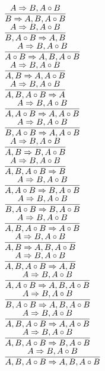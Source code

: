 \documentclass[11pt]{article}
\begin{document}
\begin{center}
\bigskip
\\$\infer{B\Rightarrow A, B, A\circ B}{A\Rightarrow B, A\circ B}$
\bigskip
\\$\infer{B, A\circ B\Rightarrow A, B}{A\Rightarrow B, A\circ B}$
\bigskip
\\$\infer{A\circ B\Rightarrow A, B, A\circ B}{A\Rightarrow B, A\circ B}$
\bigskip
\\$\infer{A, B\Rightarrow A, A\circ B}{A\Rightarrow B, A\circ B}$
\bigskip
\\$\infer{A, B, A\circ B\Rightarrow A}{A\Rightarrow B, A\circ B}$
\bigskip
\\$\infer{A, A\circ B\Rightarrow A, A\circ B}{A\Rightarrow B, A\circ B}$
\bigskip
\\$\infer{B, A\circ B\Rightarrow A, A\circ B}{A\Rightarrow B, A\circ B}$
\bigskip
\\$\infer{A, B\Rightarrow B, A\circ B}{A\Rightarrow B, A\circ B}$
\bigskip
\\$\infer{A, B, A\circ B\Rightarrow B}{A\Rightarrow B, A\circ B}$
\bigskip
\\$\infer{A, A\circ B\Rightarrow B, A\circ B}{A\Rightarrow B, A\circ B}$
\bigskip
\\$\infer{B, A\circ B\Rightarrow B, A\circ B}{A\Rightarrow B, A\circ B}$
\bigskip
\\$\infer{A, B, A\circ B\Rightarrow A\circ B}{A\Rightarrow B, A\circ B}$
\bigskip
\\$\infer{A, B\Rightarrow A, B, A\circ B}{A\Rightarrow B, A\circ B}$
\bigskip
\\$\infer{A, B, A\circ B\Rightarrow A, B}{A\Rightarrow B, A\circ B}$
\bigskip
\\$\infer{A, A\circ B\Rightarrow A, B, A\circ B}{A\Rightarrow B, A\circ B}$
\bigskip
\\$\infer{B, A\circ B\Rightarrow A, B, A\circ B}{A\Rightarrow B, A\circ B}$
\bigskip
\\$\infer{A, B, A\circ B\Rightarrow A, A\circ B}{A\Rightarrow B, A\circ B}$
\bigskip
\\$\infer{A, B, A\circ B\Rightarrow B, A\circ B}{A\Rightarrow B, A\circ B}$
\bigskip
\\$\infer{A, B, A\circ B\Rightarrow A, B, A\circ B}{A\Rightarrow B, A\circ B}$
\bigskip
\\
\end{center}
\end{document}
